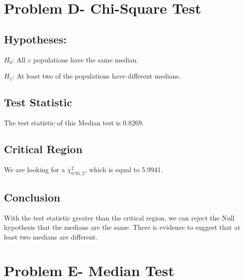 \documentclass[]{tufte-handout}
\begin{document}
\section{Problem D- Chi-Square Test}\label{problem-d--chi-square-test}

\subsection{Hypotheses:}\label{hypotheses-3}

\(H_{0}\): All \emph{c} populations have the same median.

\(H_{1}\): At least two of the populations have different medians.

\subsection{Test Statistic}\label{test-statistic-3}

The test statistic of this Median test is 0.8269.

\subsection{Critical Region}\label{critical-region-3}

We are looking for a \(\chi_{0.95, 2}^2\), which is equal to 5.9941.

\subsection{Conclusion}\label{conclusion-3}

With the test statistic greater than the critical region, we can reject
the Null hypothesis that the medians are the same. There is evidence to
suggest that at least two medians are different.

\section{Problem E- Median Test}\label{problem-e--median-test}
\end{document}
